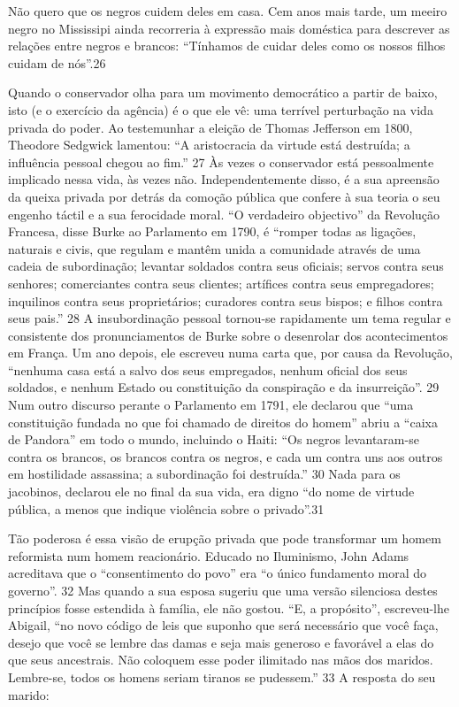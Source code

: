  \par 
Não quero que os negros cuidem deles em casa. Cem anos mais tarde, um meeiro negro no Mississipi ainda recorreria à expressão mais doméstica para descrever as relações entre negros e brancos: “Tínhamos de cuidar deles como os nossos filhos cuidam de nós”.{\color{blue}26}
 \par 
Quando o conservador olha para um movimento democrático a partir de baixo, isto (e o exercício da agência) é o que ele vê: uma terrível perturbação na vida privada do poder. Ao testemunhar a eleição de Thomas Jefferson em 1800, Theodore Sedgwick lamentou: “A aristocracia da virtude está destruída; a influência pessoal chegou ao fim.” {\color{blue}27} Às vezes o conservador está pessoalmente implicado nessa vida, às vezes não. Independentemente disso, é a sua apreensão da queixa privada por detrás da comoção pública que confere à sua teoria o seu engenho táctil e a sua ferocidade moral. “O verdadeiro objectivo” da Revolução Francesa, disse Burke ao Parlamento em 1790, é “romper todas as ligações, naturais e civis, que regulam e mantêm unida a comunidade através de uma cadeia de subordinação; levantar soldados contra seus oficiais; servos contra seus senhores; comerciantes contra seus clientes; artífices contra seus empregadores; inquilinos contra seus proprietários; curadores contra seus bispos; e filhos contra seus pais.” {\color{blue}28} A insubordinação pessoal tornou-se rapidamente um tema regular e consistente dos pronunciamentos de Burke sobre o desenrolar dos acontecimentos em França. Um ano depois, ele escreveu numa carta que, por causa da Revolução, “nenhuma casa está a salvo dos seus empregados, nenhum oficial dos seus soldados, e nenhum Estado ou constituição da conspiração e da insurreição”. {\color{blue}29} Num outro discurso perante o Parlamento em 1791, ele declarou que “uma constituição fundada no que foi chamado de direitos do homem” abriu a “caixa de Pandora” em todo o mundo, incluindo o Haiti: “Os negros levantaram-se contra os brancos, os brancos contra os negros, e cada um contra uns aos outros em hostilidade assassina; a subordinação foi destruída.” {\color{blue}30} Nada para os jacobinos, declarou ele no final da sua vida, era digno “do nome de virtude pública, a menos que indique violência sobre o privado”.{\color{blue}31}
 \par 
Tão poderosa é essa visão de erupção privada que pode transformar um homem reformista num homem reacionário. Educado no Iluminismo, John Adams acreditava que o “consentimento do povo” era “o único fundamento moral do governo”. {\color{blue}32} Mas quando a sua esposa sugeriu que uma versão silenciosa destes princípios fosse estendida à família, ele não gostou. “E, a propósito”, escreveu-lhe Abigail, “no novo código de leis que suponho que será necessário que você faça, desejo que você se lembre das damas e seja mais generoso e favorável a elas do que seus ancestrais. Não coloquem esse poder ilimitado nas mãos dos maridos. Lembre-se, todos os homens seriam tiranos se pudessem.” {\color{blue}33} A resposta do seu marido:
